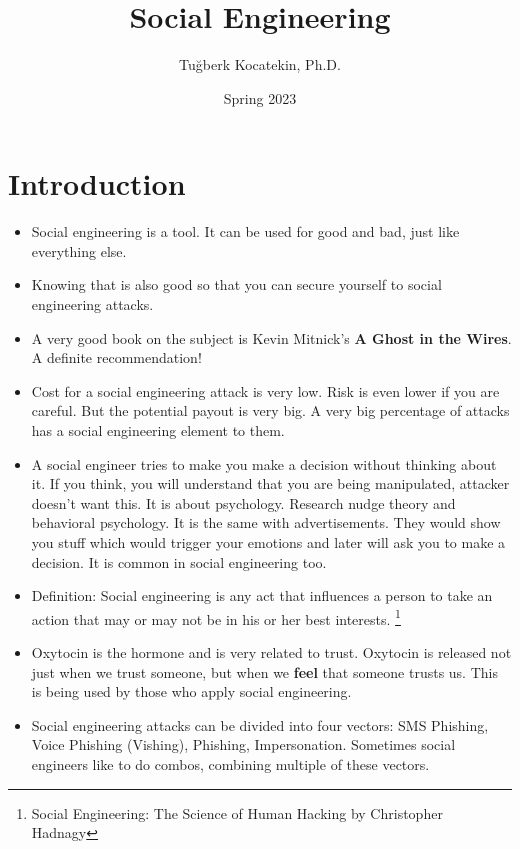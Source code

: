 \documentclass[12pt]{article}
\title{Social Engineering}
\author{Tuğberk Kocatekin, Ph.D.}
\date{Spring 2023}
\newcommand{\red}[1]{{\color{red} #1}}
\begin{document}
	
	\maketitle
	\tableofcontents
	\newpage
	
	\LARGE
	
	\section{Introduction}
	\begin{itemize}[itemsep=3em]
	
	\item Social engineering is a tool. It can be used for good and bad, just like everything else.
	
	\item Knowing that is also good so that you can secure yourself to social engineering attacks.
	
	\item A very good book on the subject is Kevin Mitnick's \textbf{A Ghost in the Wires}. A definite recommendation!
	
	\item Cost for a social engineering attack is very low. Risk is even lower if you are careful. But the potential payout is very big. A very big percentage of attacks has a social engineering element to them.

	\item A social engineer tries to make you make a decision without thinking about it. If you think, you will understand that you are being manipulated, attacker doesn't want this. It is about psychology. \red{Research nudge theory and behavioral psychology}. It is the same with advertisements. They would show you stuff which would trigger your emotions and later will ask you to make a decision. It is common in social engineering too.
	
	\item Definition: \red{Social engineering is any act that influences a person to take an action that may or may not be in his or her best interests.} \footnote{Social Engineering: The Science of Human Hacking by Christopher Hadnagy }
	
	\item Oxytocin is the hormone and is very related to trust. Oxytocin is released not just when we trust someone, but when we \textbf{feel} that someone trusts us. This is being used by those who apply social engineering.
	
	\item Social engineering attacks can be divided into four vectors: SMS Phishing, Voice Phishing (Vishing), Phishing, Impersonation. Sometimes social engineers like to do combos, combining multiple of these vectors.
	

\end{itemize}
\end{document}
